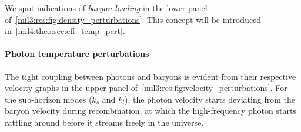 We spot indications of \textit{baryon loading} in the lower panel of~\cref{mil3:res:fig:density_perturbations}. This concept will be introduced in~\cref{mil4:theo:sec:eff_temp_pert}. 










\paragraph{Photon temperature perturbations}
The tight coupling between photons and baryons is evident from their respective velocity graphs in the upper panel of~\cref{mil3:res:fig:velocity_perturbations}. For the sub-horizon modes ($k_s$ and $k_l$), the photon velocity starts deviating from the baryon velocity during recombination, at which the high-frequency photon starts rattling around before it streams freely in the universe.

